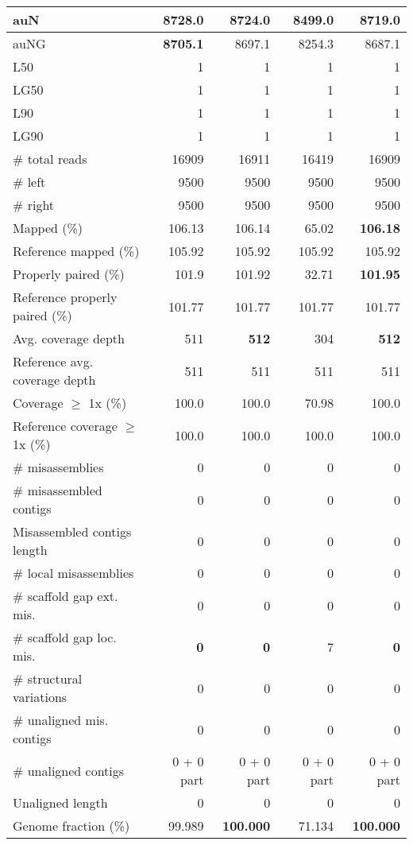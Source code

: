\documentclass[12pt,a4paper]{article}
\begin{document}
\begin{table}[ht]
\begin{center}
\begin{tabular}{|l*{4}{|r}|}
auN & {\bf 8728.0} & 8724.0 & 8499.0 & 8719.0 \\ \hline
auNG & {\bf 8705.1} & 8697.1 & 8254.3 & 8687.1 \\ \hline
L50 & 1 & 1 & 1 & 1 \\ \hline
LG50 & 1 & 1 & 1 & 1 \\ \hline
L90 & 1 & 1 & 1 & 1 \\ \hline
LG90 & 1 & 1 & 1 & 1 \\ \hline
\# total reads & 16909 & 16911 & 16419 & 16909 \\ \hline
\# left & 9500 & 9500 & 9500 & 9500 \\ \hline
\# right & 9500 & 9500 & 9500 & 9500 \\ \hline
Mapped (\%) & 106.13 & 106.14 & 65.02 & {\bf 106.18} \\ \hline
Reference mapped (\%) & 105.92 & 105.92 & 105.92 & 105.92 \\ \hline
Properly paired (\%) & 101.9 & 101.92 & 32.71 & {\bf 101.95} \\ \hline
Reference properly paired (\%) & 101.77 & 101.77 & 101.77 & 101.77 \\ \hline
Avg. coverage depth & 511 & {\bf 512} & 304 & {\bf 512} \\ \hline
Reference avg. coverage depth & 511 & 511 & 511 & 511 \\ \hline
Coverage $\geq$ 1x (\%) & 100.0 & 100.0 & 70.98 & 100.0 \\ \hline
Reference coverage $\geq$ 1x (\%) & 100.0 & 100.0 & 100.0 & 100.0 \\ \hline
\# misassemblies & 0 & 0 & 0 & 0 \\ \hline
\# misassembled contigs & 0 & 0 & 0 & 0 \\ \hline
Misassembled contigs length & 0 & 0 & 0 & 0 \\ \hline
\# local misassemblies & 0 & 0 & 0 & 0 \\ \hline
\# scaffold gap ext. mis. & 0 & 0 & 0 & 0 \\ \hline
\# scaffold gap loc. mis. & {\bf 0} & {\bf 0} & 7 & {\bf 0} \\ \hline
\# structural variations & 0 & 0 & 0 & 0 \\ \hline
\# unaligned mis. contigs & 0 & 0 & 0 & 0 \\ \hline
\# unaligned contigs & 0 + 0 part & 0 + 0 part & 0 + 0 part & 0 + 0 part \\ \hline
Unaligned length & 0 & 0 & 0 & 0 \\ \hline
Genome fraction (\%) & 99.989 & {\bf 100.000} & 71.134 & {\bf 100.000} \\ \hline

\end{tabular}
\end{center}
\end{table}
\end{document}
